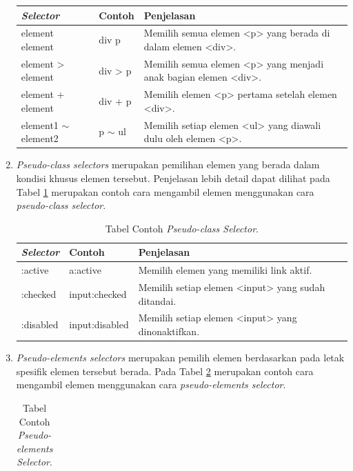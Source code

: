 \begin{enumerate}
\begin{table}[h!]
\begin{tabular}{ | m{9em} | m{2cm}| m{8cm} | }
			\hline
			\textit{\textbf{Selector}}& Contoh & Penjelasan \\ 
			\hline
			element element & div p & Memilih semua elemen <p> yang berada di dalam elemen <div>. \\ 
			\hline
			element > element & div > p & Memilih semua elemen <p> yang menjadi anak bagian elemen <div>. \\ 
			\hline
			element + element & div + p & Memilih elemen <p> pertama setelah elemen <div>. \\ 
			\hline
			element1 $\sim$ element2 & p $\sim$ ul & Memilih setiap elemen <ul> yang diawali dulu oleh elemen <p>.  \\ 
			\hline
		\end{tabular}
	\end{table}
	\item \textit{Pseudo-class selectors} merupakan pemilihan elemen yang berada dalam kondisi khusus elemen tersebut. Penjelasan lebih detail dapat dilihat pada Tabel \ref{table:pclass} merupakan contoh cara mengambil elemen menggunakan cara \textit{pseudo-class selector}. 
	\begin{table}[h!] 	\vspace{-0.4cm}
		\centering
		\caption{Tabel Contoh \textit{Pseudo-class Selector}.}
		\label{table:pclass}
		\begin{tabular}{ | m{8em} | m{3cm}| m{8cm} | } 
			\hline
			\textit{\textbf{Selector}}& Contoh & Penjelasan \\ 
			\hline
			:active & a:active & Memilih elemen yang memiliki link aktif. \\ 
			\hline
			:checked & input:checked & Memilih setiap elemen <input> yang sudah ditandai. \\ 
			\hline
			:disabled & input:disabled & Memilih setiap elemen <input> yang dinonaktifkan. \\ 
			\hline
		\end{tabular}
	\end{table}
	\item \textit{Pseudo-elements selectors } merupakan pemilih elemen berdasarkan pada letak spesifik elemen tersebut berada. Pada Tabel \ref{table:pelemen} merupakan contoh cara mengambil elemen menggunakan cara \textit{pseudo-elements selector}.
	\begin{table}[h!] \vspace{-0.4cm}
		\centering
		\caption{Tabel Contoh \textit{Pseudo-elements Selector}.}
		\label{table:pelemen}
		\begin{tabular}{ | m{8em} | m{3cm}| m{8cm} | } 

\end{tabular}
\end{table}
\end{enumerate}
